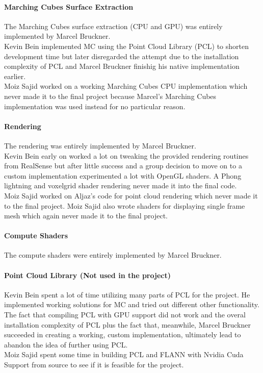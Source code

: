 \documentclass[10pt,twocolumn,letterpaper]{article}
\begin{document}
\paragraph{Marching Cubes Surface Extraction}
The Marching Cubes surface extraction (CPU and GPU) was entirely implemented by Marcel Bruckner.\\
Kevin Bein implemented MC using the Point Cloud Library (PCL) to shorten development time but later disregarded the attempt due to the installation complexity of PCL and Marcel Bruckner finishig his native implementation earlier. \\
Moiz Sajid worked on a working Marching Cubes CPU implementation which never made it to the final project because Marcel's Marching Cubes implementation was used instead for no particular reason. 

\paragraph{Rendering}
The rendering was entirely implemented by Marcel Bruckner.\\
Kevin Bein early on worked a lot on tweaking the provided rendering routines from RealSense but after little success and a group decision to move on to a custom implementation experimented a lot with OpenGL shaders. A Phong lightning and voxelgrid shader rendering never made it into the final code. \\
Moiz Sajid worked on Aljaz's code for point cloud rendering which never made it to the final project. Moiz Sajid also wrote shaders for displaying single frame mesh which again never made it to the final project. 

\paragraph{Compute Shaders}
The compute shaders were entirely implemented by Marcel Bruckner.

\paragraph{Point Cloud Library (Not used in the project)}
Kevin Bein spent a lot of time utilizing many parts of PCL for the project. He implemented working solutions for MC and tried out different other functionality. The fact that compiling PCL with GPU support did not work and the overal installation complexity of PCL plus the fact that, meanwhile, Marcel Bruckner succeeded in creating a working, custom implementation, ultimately lead to abandon the idea of further using PCL. \\
Moiz Sajid spent some time in building PCL and FLANN with Nvidia Cuda Support from source to see if it is feasible for the project.
\end{document}
